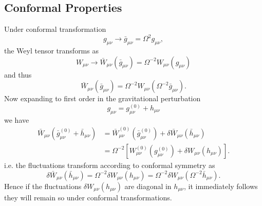 \documentclass[10pt,letterpaper]{article}
\newcommand{\blr}[1]{\left[#1\right]} %
\newcommand{\be}{\begin{equation}} %
\newcommand{\ee}{\end{equation}} %
\numberwithin{equation}{section}
\begin{document}
\subsection{Conformal Properties}
Under conformal transformation
\be
	g_{\mu\nu} \to \bar g_{\mu\nu}=\Omega^2 g_{\mu\nu} ,
\ee
the Weyl  tensor  transforms as
\be
	W_{\mu\nu} \to \bar W_{\mu\nu}(\bar g_{\mu\nu})  = \Omega^{-2}W_{\mu\nu}(g_{\mu\nu})
\ee
and thus
\be
	\bar W_{\mu\nu}(\bar g_{\mu\nu}) =  \Omega^{-2}W_{\mu\nu}(\Omega^{-2}\bar g_{\mu\nu}).
\ee
Now expanding to first order in the gravitational
perturbation
\be
	g_{\mu\nu} = g^{(0)}_{\mu\nu} + h_{\mu\nu}
\ee
we have 
\begin{align}
	\bar W_{\mu\nu}(\bar g^{(0)}_{\mu\nu}+ \bar h_{\mu\nu}) &= \bar W_{\mu\nu}^{(0)}(\bar g^{(0)}_{\mu\nu}) + \delta \bar W_{\mu\nu}(\bar h_{\mu\nu})\\
	&=\Omega^{-2}\blr{W^{(0)}_{\mu\nu}(g^{(0)}_{\mu\nu})+ \delta W_{\mu\nu}(h_{\mu\nu})} \nonumber.
\end{align}
i.e. the  fluctuations transform according to conformal symmetry as 
\be
	\delta \bar W_{\mu\nu}(\bar h_{\mu\nu}) = \Omega^{-2} \delta W_{\mu\nu}(h_{\mu\nu}) = \Omega^{-2} \delta W_{\mu\nu}(\Omega^{-2}\bar h_{\mu\nu})\label{dwconf}.
\ee
Hence if the fluctuations  $\delta W_{\mu\nu}(h_{\mu\nu})$ are diagonal in $h_{\mu\nu}$, it immediately follows they will remain so under conformal transformations. 
\end{document}
